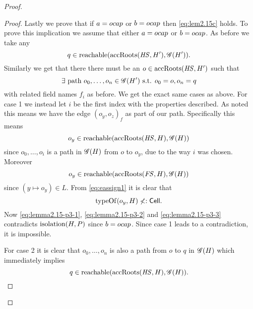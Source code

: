 \begin{proof}
\begin{description}
\begin{description}
\begin{description}
\begin{proof}
                Lastly we prove that if $a = \mbox{$ocap$}$ or $b = \mbox{$ocap$}$ then
                \eqref{eq:lem2.15c} holds. To prove this implication we assume
                that either $a = \mbox{$ocap$}$ or $b = \mbox{$ocap$}$. As before we take any
                \begin{equation}
                  q \in \mbox{$\mathrm{reachable}$}(\mbox{$\mathrm{accRoots}$}(\mathit{HS}, H'), \mathscr{G}(H')).
                \end{equation}
                Similarly we get that there there must be an $o \in
                \mbox{$\mathrm{accRoots}$}(\mathit{HS}, H')$ such that
                \begin{equation}
                  \exists \text{ path } o_0, \dots, o_n \in \mathscr{G}(H') \text{ s.t. } o_0 = o,
                  o_n = q
                \end{equation}
                with related field names $f_i$ as before. We get the exact same
                cases as above. For case 1 we instead let $i$ be the first index with
                the properties described. As noted this means we have the edge
                $(o_y, o_z)_f$ as part of our path. Specifically this means
                \begin{equation}\label{eq:lemma2.15-p3-1}
                  o_y \in \mbox{$\mathrm{reachable}$}(\mbox{$\mathrm{accRoots}$}(\mathit{HS}, H), \mathscr{G}(H))
                \end{equation}
                since $o_0, \dots, o_i$ is a path in $\mathscr{G}(H)$ from $o$ to
                $o_y$, due to the way $i$ was chosen.  Moreover
                \begin{equation}\label{eq:lemma2.15-p3-2}
                  o_y \in \mbox{$\mathrm{reachable}$}(\mbox{$\mathrm{accRoots}$}(\mathit{FS}, H), \mathscr{G}(H))
                \end{equation}
                since $(y \mapsto o_y) \in L$. From \eqref{eq:eassign1} it is clear that
                \begin{equation}\label{eq:lemma2.15-p3-3}
                  \mbox{$\mathrm{typeOf}$}(o_y, H) \not<: \mbox{$\mathsf{Cell}$}.
                \end{equation}
                Now \eqref{eq:lemma2.15-p3-1}, \eqref{eq:lemma2.15-p3-2} and
                \eqref{eq:lemma2.15-p3-3} contradicts $\mbox{$\mathrm{isolation}$}(H, P)$ since $b =
                \mbox{$ocap$}$. Since case 1 leads to a contradiction, it is impossible.
                
                For case 2 it is clear that $o_0, \dots, o_n$ is also a
                path from $o$ to $q$ in $\mathscr{G}(H)$ which immediately implies 
                \begin{equation}
                  q \in \mbox{$\mathrm{reachable}$}(\mbox{$\mathrm{accRoots}$}(\mathit{HS}, H), \mathscr{G}(H)).
                \end{equation}
              \end{proof}


\end{description}
\end{description}
\end{description}
\end{proof}
